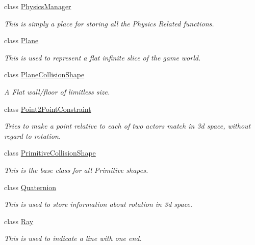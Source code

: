 \begin{DoxyCompactItemize}
\item 
class \hyperlink{classMezzanine_1_1PhysicsManager}{PhysicsManager}
\begin{DoxyCompactList}\small\item\em This is simply a place for storing all the Physics Related functions. \item\end{DoxyCompactList}\item 
class \hyperlink{classMezzanine_1_1Plane}{Plane}
\begin{DoxyCompactList}\small\item\em This is used to represent a flat infinite slice of the game world. \item\end{DoxyCompactList}\item 
class \hyperlink{classMezzanine_1_1PlaneCollisionShape}{PlaneCollisionShape}
\begin{DoxyCompactList}\small\item\em A Flat wall/floor of limitless size. \item\end{DoxyCompactList}\item 
class \hyperlink{classMezzanine_1_1Point2PointConstraint}{Point2PointConstraint}
\begin{DoxyCompactList}\small\item\em Tries to make a point relative to each of two actors match in 3d space, without regard to rotation. \item\end{DoxyCompactList}\item 
class \hyperlink{classMezzanine_1_1PrimitiveCollisionShape}{PrimitiveCollisionShape}
\begin{DoxyCompactList}\small\item\em This is the base class for all Primitive shapes. \item\end{DoxyCompactList}\item 
class \hyperlink{classMezzanine_1_1Quaternion}{Quaternion}
\begin{DoxyCompactList}\small\item\em This is used to store information about rotation in 3d space. \item\end{DoxyCompactList}\item 
class \hyperlink{classMezzanine_1_1Ray}{Ray}
\begin{DoxyCompactList}\small\item\em This is used to indicate a line with one end. \item\end{DoxyCompactList}\item 

\end{DoxyCompactItemize}
